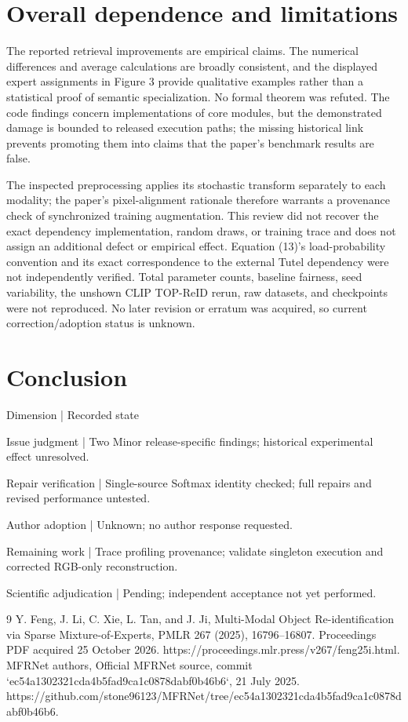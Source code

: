 \documentclass[10pt]{article}
\begin{document}
\section*{Overall dependence and limitations}
The reported retrieval improvements are empirical claims. The numerical differences and average calculations are broadly consistent, and the displayed expert assignments in Figure 3 provide qualitative examples rather than a statistical proof of semantic specialization. No formal theorem was refuted. The code findings concern implementations of core modules, but the demonstrated damage is bounded to released execution paths; the missing historical link prevents promoting them into claims that the paper’s benchmark results are false.\par
The inspected preprocessing applies its stochastic transform separately to each modality; the paper’s pixel-alignment rationale therefore warrants a provenance check of synchronized training augmentation. This review did not recover the exact dependency implementation, random draws, or training trace and does not assign an additional defect or empirical effect. Equation (13)’s load-probability convention and its exact correspondence to the external Tutel dependency were not independently verified. Total parameter counts, baseline fairness, seed variability, the unshown CLIP TOP-ReID rerun, raw datasets, and checkpoints were not reproduced. No later revision or erratum was acquired, so current correction/adoption status is unknown.\par
\section*{Conclusion}
Dimension | Recorded state\par
Issue judgment | Two Minor release-specific findings; historical experimental effect unresolved.\par
Repair verification | Single-source Softmax identity checked; full repairs and revised performance untested.\par
Author adoption | Unknown; no author response requested.\par
Remaining work | Trace profiling provenance; validate singleton execution and corrected RGB-only reconstruction.\par
Scientific adjudication | Pending; independent acceptance not yet performed.\par
9 Y. Feng, J. Li, C. Xie, L. Tan, and J. Ji, Multi-Modal Object Re-identification via Sparse Mixture-of-Experts, PMLR 267 (2025), 16796–16807. Proceedings PDF acquired 25 October 2026. https://proceedings.mlr.press/v267/feng25i.html. MFRNet authors, Official MFRNet source, commit `ec54a1302321cda4b5fad9ca1c0878dabf0b46b6`, 21 July 2025. https://github.com/stone96123/MFRNet/tree/ec54a1302321cda4b5fad9ca1c0878dabf0b46b6.\par
\end{document}
